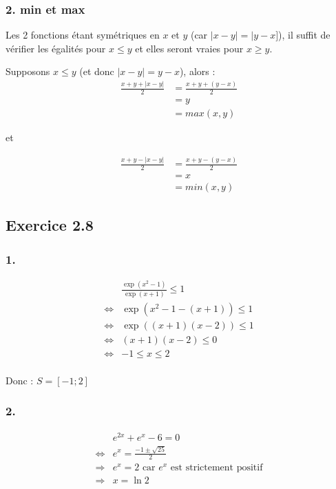 \documentclass[a4paper,10pt]{report}
\begin{document}
\subsubsection*{2. min et max}

Les 2 fonctions étant symétriques en $x$ et $y$ (car $|x-y| = |y-x]$), il suffit de vérifier les égalités
pour $x \leq y$ et elles seront vraies pour $x \geq y$.

Supposons $x \leq y$ (et donc $|x-y|=y-x$), alors :
\begin{equation*}
	\begin{split}
		\frac{x + y + |x-y|}{2} &= \frac{x + y + (y-x)}{2} \\
		                        &= y \\
		                        &= max(x,y)
	\end{split}
\end{equation*}

et

\begin{equation*}
	\begin{split}
		\frac{x + y - |x-y|}{2} &= \frac{x + y - (y-x)}{2} \\
		&= x \\
		&= min(x,y)
	\end{split}
\end{equation*}

\subsection*{Exercice 2.8}

\subsubsection*{1.}
\begin{equation*}
	\begin{split}
		&\frac{\exp(x^2-1)}{\exp(x+1)} \leq 1 \\
		\Longleftrightarrow &\exp(x^2-1 -(x+1)) \leq 1 \\
		\Longleftrightarrow &\exp((x+1)(x-2)) \leq 1 \\
		\Longleftrightarrow &(x+1)(x-2) \leq 0 \\
		\Longleftrightarrow & -1 \leq x \leq 2 \\
	\end{split}
\end{equation*}

Donc : $S= [-1 ; 2]$

\subsubsection*{2.}
\begin{equation*}
	\begin{split}
		& e^{2x} + e^x -6 = 0 \\
		\Longleftrightarrow & e^x = \frac{-1\pm \sqrt{25}}{2} \\
		\Longrightarrow & e^x = 2 \text{ car $e^x$ est strictement positif} \\
		\Longrightarrow & x = \ln 2
	\end{split}
\end{equation*}
\end{document}
